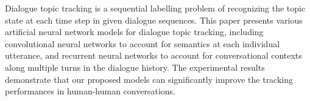 Dialogue topic tracking is a sequential labelling problem of recognizing the topic state at each time step in given dialogue sequences. This paper presents various artificial neural network models for dialogue topic tracking, including convolutional neural networks to account for semantics at each individual utterance, and recurrent neural networks to account for conversational contexts along multiple turns in the dialogue history. The experimental results demonstrate that our proposed models can significantly improve the tracking performances in human-human conversations.
